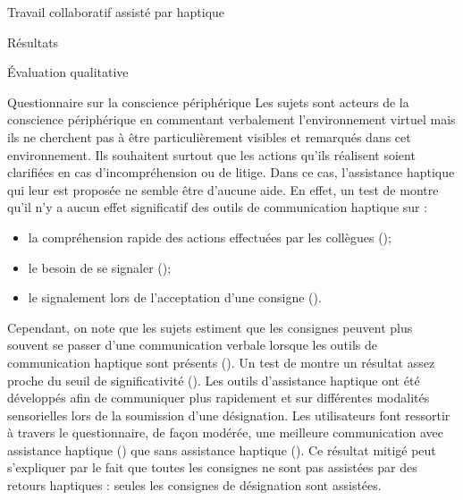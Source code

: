 \documentclass[myfrancais,ngerman,english,french]{mythesis}
\begin{document}
\begin{mychapter}{Travail collaboratif assisté par haptique}
\begin{mysection}{Résultats}
\begin{mysubsection}{Évaluation qualitative}
\begin{mysubsubsection}{Questionnaire sur la conscience périphérique}
					Les sujets sont acteurs de la conscience périphérique en commentant verbalement l'environnement virtuel mais ils ne cherchent pas à être particulièrement visibles et remarqués dans cet environnement.
					Ils souhaitent surtout que les actions qu'ils réalisent soient clarifiées en cas d'incompréhension ou de litige.
					Dans ce cas, l'assistance haptique qui leur est proposée ne semble être d'aucune aide.
					En effet, un test de  montre qu'il n'y a aucun effet significatif des outils de communication haptique sur :
					\begin{itemize}
						\item la compréhension rapide des actions effectuées par les collègues ();
						\item le besoin de se signaler ();
						\item le signalement lors de l'acceptation d'une consigne ().
					\end{itemize}

					Cependant, on note que les sujets estiment que les consignes peuvent plus souvent se passer d'une communication verbale lorsque les outils de communication haptique sont présents ().
					Un test de  montre un résultat assez proche du seuil de significativité ().
					Les outils d'assistance haptique ont été développés afin de communiquer plus rapidement et sur différentes modalités sensorielles lors de la soumission d'une désignation.
					Les utilisateurs font ressortir à travers le questionnaire, de façon modérée, une meilleure communication avec assistance haptique () que sans assistance haptique ().
					Ce résultat mitigé peut s'expliquer par le fait que toutes les consignes ne sont pas assistées par des retours haptiques : seules les consignes de désignation sont assistées.


\end{mysubsubsection}
\end{mysubsection}
\end{mysection}
\end{mychapter}
\end{document}
